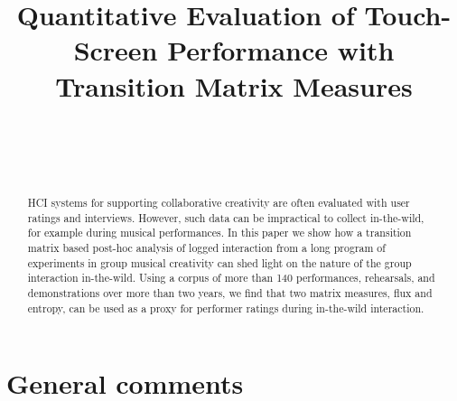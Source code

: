 \documentclass{sigchi}
\begin{document}
\title{Quantitative Evaluation of Touch-Screen Performance with
  Transition Matrix Measures}

\author{%
  \\
  \\
  \\
}

\maketitle

\begin{abstract}
  HCI systems for supporting collaborative creativity are often
  evaluated with user ratings and interviews. However, such data can
  be impractical to collect in-the-wild, for example during musical
  performances. In this paper we show how a transition matrix based
  post-hoc analysis of logged interaction from a long program of
  experiments in group musical creativity can shed light on the nature
  of the group interaction in-the-wild. Using a corpus of more than
  140 performances, rehearsals, and demonstrations over more than two
  years, we find that two matrix measures, flux and entropy, can be
  used as a proxy for performer ratings during in-the-wild
  interaction.
\end{abstract}




\section{General comments}
\end{document}
